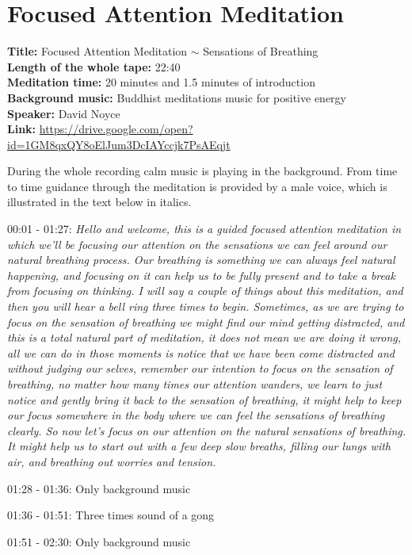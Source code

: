 \chapter{Focused Attention Meditation} \label{FAM}
\textbf{Title:} Focused Attention Meditation $\sim$  Sensations of Breathing  \\
\textbf{Length of the whole tape:} 22:40 \\
\textbf{Meditation time:} 20 minutes and 1.5 minutes of introduction \\
\textbf{Background music:} Buddhist meditations music for positive energy  \\
\textbf{Speaker:} David Noyce \\
\textbf{Link:} \href{<url>}{https://drive.google.com/open?id=1GM8qxQY8oElJum3DcIAYccjk7PsAEqjt}

During the whole recording calm music is playing in the background. From time to time guidance through the meditation is provided by a male voice, which is illustrated in the text below in italics. 

00:01 - 01:27: \textit{Hello and welcome, this is a guided focused attention meditation in which we'll be focusing our attention on the sensations we can feel around our natural breathing process. Our breathing is something we can always feel natural happening, and focusing on it can help us to be fully present and to take a break from focusing on thinking. I will say a couple of things about this meditation, and then you will hear a bell ring three times to begin. Sometimes, as we are trying to focus on the sensation of breathing we might find our mind getting distracted, and this is a total natural part of meditation, it does not mean we are doing it wrong, all we can do in those moments is notice that we have been come distracted and without judging our selves, remember our intention to focus on the sensation of breathing, no matter how many times our attention wanders, we learn to just notice and gently bring it back to the sensation of breathing, it might help to keep our focus somewhere in the body where we can feel the sensations of breathing clearly. So now let's focus on our attention on the natural sensations of breathing. It might help us to start out with a few deep slow breaths, filling our lungs with air, and breathing out worries and tension.}

01:28 - 01:36: Only background music 

01:36 - 01:51: Three times sound of a gong 

01:51 - 02:30: Only background music

